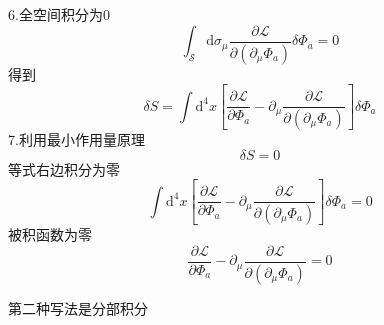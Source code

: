 6.全空间积分为0
\begin{equation}
    \int_{\mathcal{S}}{\mathrm{d}\sigma _{\mu}}\frac{\partial \mathcal{L}}{\partial \left( \partial _{\mu}\Phi _a \right)}\delta \Phi _a=0
\end{equation}
得到
\begin{equation}
    \delta S=\int{\mathrm{d}^4x}\left[ \frac{\partial \mathcal{L}}{\partial \Phi _a}-\partial _{\mu}\frac{\partial \mathcal{L}}{\partial \left( \partial _{\mu}\Phi _a \right)} \right] \delta \Phi _a
\end{equation}
7.利用最小作用量原理
\begin{equation}
    \delta S=0
\end{equation}
等式右边积分为零
\begin{equation}
    \int{\mathrm{d}^4x}\left[ \frac{\partial \mathcal{L}}{\partial \Phi _a}-\partial _{\mu}\frac{\partial \mathcal{L}}{\partial \left( \partial _{\mu}\Phi _a \right)} \right] \delta \Phi _a=0
\end{equation}
被积函数为零
\begin{equation}
    \frac{\partial \mathcal{L}}{\partial \Phi _a}-\partial _{\mu}\frac{\partial \mathcal{L}}{\partial \left( \partial _{\mu}\Phi _a \right)}=0
\end{equation}


第二种写法是分部积分











\subsection{}

















